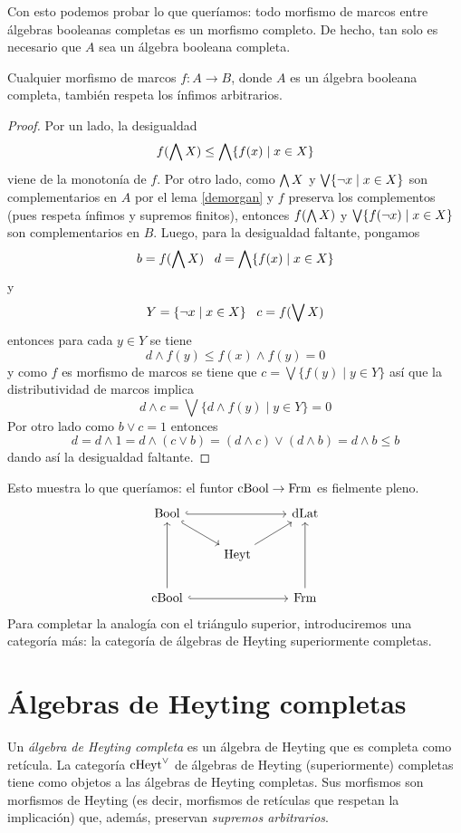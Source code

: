 Con esto podemos probar lo que queríamos: todo morfismo de marcos
entre álgebras booleanas completas es un morfismo completo.
De hecho, tan solo es necesario que $A$ sea un álgebra booleana
completa.
\begin{lemma}
    Cualquier morfismo de marcos $f:A\to B$,
    donde $A$ es un álgebra booleana completa,
    también respeta los ínfimos arbitrarios.
\end{lemma}
\begin{proof}
    Por un lado, la desigualdad
    \[
        f(\bigwedge X)\leq\bigwedge\{f(x)\mid x\in X\}
    \]
    viene de la monotonía de $f$.
    Por otro lado, como $\bigwedge X$ y $\bigvee\{\neg x\mid x\in X\}$
    son complementarios en $A$ por el lema \ref{demorgan}
    y $f$ preserva los complementos
    (pues respeta ínfimos y supremos finitos), entonces $f(\bigwedge X)$
    y $\bigvee\{f(\neg x)\mid x\in X\}$ son complementarios en $B$.
    Luego, para la desigualdad faltante, pongamos \[b=f(\bigwedge X)\;\;\; d=\bigwedge\{f(x)\mid x\in X\}\]
    y \[Y=\{\neg x\mid x\in X\}\;\;\; c=f(\bigvee X)\]
    entonces para cada $y\in Y$ se tiene \[d\wedge f(y)\leq f(x)\wedge f(y)=0\]
    y como $f$ es morfismo de marcos se tiene que $c=\bigvee\{f(y)\mid y\in Y\}$
    así que la distributividad de marcos implica 
    \[d\wedge c=\bigvee\{d\wedge f(y)\mid y\in Y\}=0\]
  Por otro lado como $b\vee c=1$ entonces
  \[d=d\wedge 1=d\wedge (c\vee b)=(d\wedge c)\vee(d\wedge b)=d\wedge b\leq b\]
  dando así la desigualdad faltante.
\end{proof}

Esto muestra lo que queríamos: el funtor $\mathrm{cBool}\to\mathrm{Frm}$ es fielmente
pleno.
\begin{equation}\label{diag:cuadrado-cba-frm}
\begin{tikzcd}
  \Bool \ar[dr,hook] \ar[rr,hook] &               & \DLat \\
                                  & \Heyt \ar[ur]         \\
  \CBA \ar[uu] \ar[rr,hook] &           & \Frm \ar[uu]
\end{tikzcd}
\end{equation}
Para completar la analogía con el triángulo superior, introduciremos
una categoría más: la categoría de álgebras de Heyting superiormente
completas.

\section{Álgebras de Heyting completas}

\begin{definition}\label{heyt}
  Un \emph{álgebra de Heyting completa} es un álgebra de Heyting que es
  completa como retícula.
  La categoría $\mathrm{cHeyt}^\vee$ de álgebras de Heyting (superiormente)
  completas tiene como objetos a las álgebras de Heyting completas.
  Sus morfismos son morfismos de Heyting (es decir, morfismos de
  retículas que respetan la implicación) que, además, preservan
  \emph{supremos arbitrarios}.
\end{definition}

